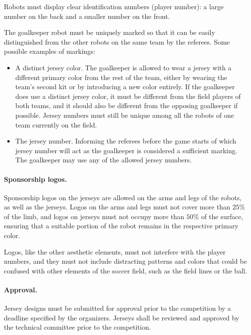 Robots must display clear identification numbers (player number): a large number on the back and a smaller number on the front.

The goalkeeper robot must be uniquely marked so that it can be easily distinguished from the other robots on the same team by the referees. Some possible examples of markings:

\begin{itemize}
	\item A distinct jersey color. The goalkeeper is allowed to wear a jersey with a different primary color from the rest of the team, either by wearing the team's second kit or by introducing a new color entirely. If the goalkeeper does use a distinct jersey color, it must be different from the field players of both teams, and it should also be different from the opposing goalkeeper if possible. Jersey numbers must still be unique among all the robots of one team currently on the field.
	\item The jersey number. Informing the referees before the game starts of which jersey number will act as the goalkeeper is considered a sufficient marking. The goalkeeper may use any of the allowed jersey numbers.
\end{itemize}

\paragraph*{Sponsorship logos.}
Sponsorship logos on the jerseys are allowed on the arms and legs of the robots, as well as the jerseys. Logos on the arms and legs must not cover more than $25\%$ of the limb, and logos on jerseys must not occupy more than $50\%$ of the surface, ensuring that a suitable portion of the robot remains in the respective primary color.

Logos, like the other aesthetic elements, must not interfere with the player numbers, and they must not include distracting patterns and colors that could be confused with other elements of the soccer field, such as the field lines or the ball.

\paragraph*{Approval.}
Jersey designs must be submitted for approval prior to the competition by a deadline specified by the organizers.
Jerseys shall be reviewed and approved by the technical committee prior to the competition.
